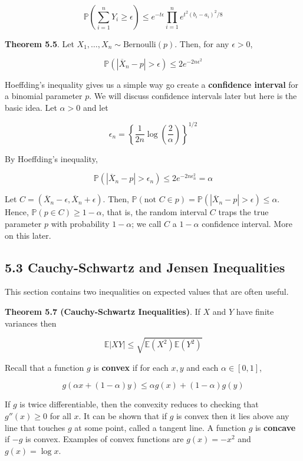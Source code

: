 \[ \mathbb{P}\left( \sum_{i=1}^n Y_i \geq \epsilon \right) \leq e^{-t\epsilon} \prod_{i=1}^n e^{t^2(b_i - a_i)^2 / 8} \]

\textbf{Theorem 5.5}. Let \(X_1, \dots, X_n \sim \text{Bernoulli}(p)\).
Then, for any \(\epsilon > 0\),

\[ \mathbb{P}(|\overline{X}_n - p| > \epsilon) \leq 2e^{-2n\epsilon^2} \]

Hoeffding's inequality gives us a simple way go create a
\textbf{confidence interval} for a binomial parameter \(p\). We will
discuss confidence intervals later but here is the basic idea. Let
\(\alpha > 0\) and let

\[ \epsilon_n = \left\{ \frac{1}{2n} \log \left( \frac{2}{\alpha} \right) \right\}^{1/2} \]

By Hoeffding's inequality,

\[ \mathbb{P}(|\overline{X}_n - p| > \epsilon_n) \leq 2e^{-2n\epsilon_n^2} = \alpha \]

Let \(C = (\overline{X}_n - \epsilon, \overline{X}_n + \epsilon)\).
Then,
\(\mathbb{P}(\text{not } C \in p) = \mathbb{P}(|\overline{X}_n - p| > \epsilon) \leq \alpha\).
Hence, \(\mathbb{P}(p \in C) \geq 1 - \alpha\), that is, the random
interval \(C\) traps the true parameter \(p\) with probability
\(1 - \alpha\); we call \(C\) a \(1 - \alpha\) confidence interval. More
on this later.

\subsection{5.3 Cauchy-Schwartz and Jensen
Inequalities}\label{cauchy-schwartz-and-jensen-inequalities}

This section contains two inequalities on expected values that are often
useful.

\textbf{Theorem 5.7 (Cauchy-Schwartz Inequalities)}. If \(X\) and \(Y\)
have finite variances then

\[ \mathbb{E}|XY| \leq \sqrt{\mathbb{E}\left(X^2\right) \mathbb{E}\left(Y^2\right)} \]

Recall that a function \(g\) is \textbf{convex} if for each \(x, y\) and
each \(\alpha \in [0, 1]\),

\[ g(\alpha x + (1 - \alpha)y) \leq \alpha g(x) + (1 - \alpha) g(y) \]

If \(g\) is twice differentiable, then the convexity reduces to checking
that \(g''(x) \geq 0\) for all \(x\). It can be shown that if \(g\) is
convex then it lies above any line that touches \(g\) at some point,
called a tangent line. A function \(g\) is \textbf{concave} if \(-g\) is
convex. Examples of convex functions are \(g(x) = -x^2\) and
\(g(x) = \log x\).

